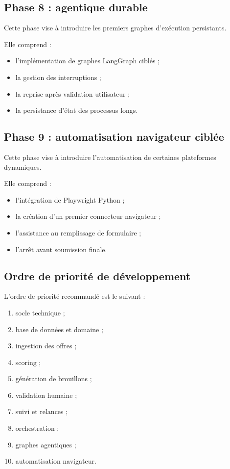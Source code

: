 \documentclass[11pt,a4paper]{article}
\begin{document}
\subsection{Phase 8 : agentique durable}

Cette phase vise à introduire les premiers graphes d’exécution persistants.

Elle comprend :

\begin{itemize}
    \item l’implémentation de graphes LangGraph ciblés ;
    \item la gestion des interruptions ;
    \item la reprise après validation utilisateur ;
    \item la persistance d’état des processus longs.
\end{itemize}

\subsection{Phase 9 : automatisation navigateur ciblée}

Cette phase vise à introduire l’automatisation de certaines plateformes dynamiques.

Elle comprend :

\begin{itemize}
    \item l’intégration de Playwright Python ;
    \item la création d’un premier connecteur navigateur ;
    \item l’assistance au remplissage de formulaire ;
    \item l’arrêt avant soumission finale.
\end{itemize}

\subsection{Ordre de priorité de développement}

L’ordre de priorité recommandé est le suivant :

\begin{enumerate}
    \item socle technique ;
    \item base de données et domaine ;
    \item ingestion des offres ;
    \item scoring ;
    \item génération de brouillons ;
    \item validation humaine ;
    \item suivi et relances ;
    \item orchestration ;
    \item graphes agentiques ;
    \item automatisation navigateur.
\end{enumerate}
\end{document}
